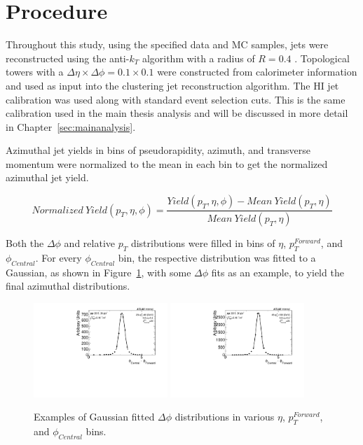 \section{Procedure}
Throughout this study, using the specified data and MC samples, jets were reconstructed using the anti-$k_{T}$ algorithm with a radius of $R=0.4$ \cite{Cacciari:2008qp}. Topological towers with a $\Delta\eta\times\Delta\phi = 0.1\times0.1$ were constructed from calorimeter information and used as input into the clustering jet reconstruction algorithm. The HI jet calibration was used along with standard event selection cuts. This is the same calibration used in the main thesis analysis and will be discussed in more detail in Chapter~\ref{sec:mainanalysis}.

Azimuthal jet yields in bins of pseudorapidity, azimuth, and transverse momentum were normalized to the mean in each bin to get the normalized azimuthal jet yield.

\begin{equation}
Normalized\ Yield(p_{T},\eta,\phi) = \frac{Yield(p_{T},\eta,\phi) - Mean\ Yield(p_{T},\eta)}{Mean\ Yield(p_{T},\eta)}
\end{equation}

Both the $\Delta\phi$ and relative $p_{T}$ distributions were filled in bins of $\eta$, $p_{T}^{Forward}$, and $\phi_{Central}$. For every $\phi_{Central}$ bin, the respective distribution was fitted to a Gaussian, as shown in Figure~\ref{fig:fitting}, with some $\Delta\phi$ fits as an example, to yield the final azimuthal distributions.

\begin{figure}
	\centering
	{\includegraphics[width=0.45\textwidth]{figures/qualification/dPhiFit1.pdf}}
	{\includegraphics[width=0.45\textwidth]{figures/qualification/dPhiFit2.pdf}} %
	\caption{Examples of Gaussian fitted $\Delta\phi$ distributions in various $\eta$, $p_{T}^{Forward}$, and $\phi_{Central}$ bins.}%
	\label{fig:fitting}%
\end{figure}


